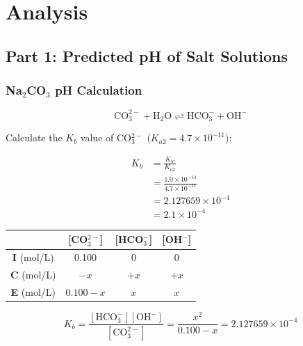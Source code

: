 \documentclass{article}
\begin{document}
\section*{Analysis}

\subsection*{Part 1: Predicted pH of Salt Solutions}

\subsubsection*{Na$_2$CO$_3$ pH Calculation}

\begin{equation*}
\text{CO}_3^{2-} + \text{H}_2\text{O} \rightleftharpoons \text{HCO}_3^- + \text{OH}^-
\end{equation*}

Calculate the $K_b$ value of CO$_3^{2-}$ ($K_{a2} = 4.7 \times 10^{-11}$):

\noindent
\begin{minipage}[t]{0.5\textwidth}
    \begin{align*}
        K_b &= \frac{K_w}{K_{a2}} \\
        &= \frac{1.0 \times 10^{-14}}{4.7 \times 10^{-11}} \\
        &= 2.127659 \times 10^{-4} \\
        &= 2.1 \times 10^{-4}
    \end{align*}
\end{minipage}

\vspace{0.1in}
\begin{table}[h!]
    \centering
    \renewcommand{\arraystretch}{2.0}
    \begin{tabular}{|c|c|c|c|}
        \hline
        & [CO$_3^{2-}$] & [HCO$_3^-$] & [OH$^-$] \\
        \hline
        \textbf{I} (mol/L) & 0.100 & 0 & 0 \\
        \hline
        \textbf{C} (mol/L) & $-x$ & $+x$ & $+x$ \\
        \hline
        \textbf{E} (mol/L) & $0.100-x$ & $x$ & $x$ \\
        \hline
    \end{tabular}
\end{table}

\begin{equation*}
K_b = \frac{[\text{HCO}_3^-][\text{OH}^-]}{[\text{CO}_3^{2-}]} = \frac{x^2}{0.100-x} = 2.127659 \times 10^{-4}
\end{equation*}
\end{document}
